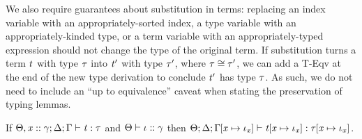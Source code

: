 We also require guarantees about substitution in terms:
replacing an index variable with an appropriately-sorted index,
a type variable with an appropriately-kinded type,
or a term variable with an appropriately-typed expression
should not change the type of the original term.
If substitution turns a term $\mathit{t}$ with type $\mathit{\tau}$
into $\mathit{t}'$ with type $\mathit{\tau}'$,
where $\mathit{\tau} \cong \mathit{\tau}'$,
we can add a {\sc T-Eqv} at the end of the new type derivation
to conclude $\mathit{t}'$ has type $\mathit{\tau}$.
As such, we do not need to include an ``up to equivalence'' caveat
when stating the preservation of typing lemmas.

\begin{lemma}
  \label{IESub}
  If $\Theta,\mathit{x} :: \mathit{\gamma};\Delta;\Gamma \vdash \mathit{t} : \mathit{\tau}$
  and $\Theta \vdash \mathit{\iota} :: \mathit{\gamma}$
  then $\Theta;\Delta;\Gamma\hspace{-2pt}\left[ \mathit{x} \mapsto \mathit{\iota}_{\mathit{x}} \right] \vdash \mathit{t}\hspace{-2pt}\left[ \mathit{x} \mapsto \mathit{\iota}_{\mathit{x}} \right] : \mathit{\tau}\hspace{-2pt}\left[ \mathit{x} \mapsto \mathit{\iota}_{\mathit{x}} \right]$.
\end{lemma}
